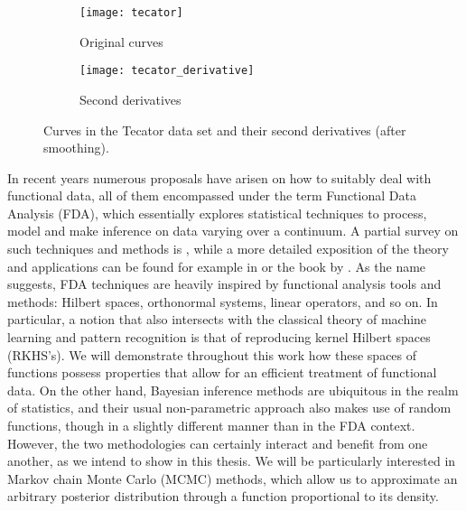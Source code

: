 \begin{figure}[ht!]
  \begin{subfigure}[b]{0.48\textwidth}
    \texttt{[image: tecator]}
    \caption{Original curves}\label{fig:tecator_orig}
  \end{subfigure}
  \hfill
  \begin{subfigure}[b]{0.48\textwidth}
    \texttt{[image: tecator\_derivative]}
    \caption{Second derivatives}\label{fig:tecator_derivatives}
  \end{subfigure}
  \caption{Curves in the Tecator data set and their second derivatives (after smoothing).}\label{fig:tecator}
\end{figure}

In recent years numerous proposals have arisen on how to suitably deal with functional data, all of them encompassed under the term Functional Data Analysis (FDA), which essentially explores statistical techniques to process, model and make inference on data varying over a continuum. A partial survey on such techniques and methods is \citet{cuevas2014partial}, while a more detailed exposition of the theory and applications can be found for example in \citet{hsing2015theoretical} or the book by \citet{horvath2012inference}. As the name suggests, FDA techniques are heavily inspired by functional analysis tools and methods: Hilbert spaces, orthonormal systems, linear operators, and so on. In particular, a notion that also intersects with the classical theory of machine learning and pattern recognition is that of reproducing kernel Hilbert spaces (RKHS's). We will demonstrate throughout this work how these spaces of functions possess properties that allow for an efficient treatment of functional data. On the other hand, Bayesian inference methods are ubiquitous in the realm of statistics, and their usual non-parametric approach also makes use of random functions, though in a slightly different manner than in the FDA context. However, the two methodologies can certainly interact and benefit from one another, as we intend to show in this thesis. We will be particularly interested in Markov chain Monte Carlo (MCMC) methods, which allow us to approximate an arbitrary posterior distribution through a function proportional to its density.

\begin{center}
\color{teal}\FourStar
\end{center}

